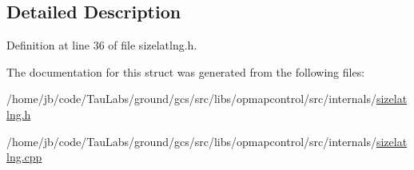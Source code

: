 \subsection{\-Detailed \-Description}


\-Definition at line 36 of file sizelatlng.\-h.



\-The documentation for this struct was generated from the following files\-:\begin{DoxyCompactItemize}
\item 
/home/jb/code/\-Tau\-Labs/ground/gcs/src/libs/opmapcontrol/src/internals/\hyperlink{sizelatlng_8h}{sizelatlng.\-h}\item 
/home/jb/code/\-Tau\-Labs/ground/gcs/src/libs/opmapcontrol/src/internals/\hyperlink{sizelatlng_8cpp}{sizelatlng.\-cpp}\end{DoxyCompactItemize}
